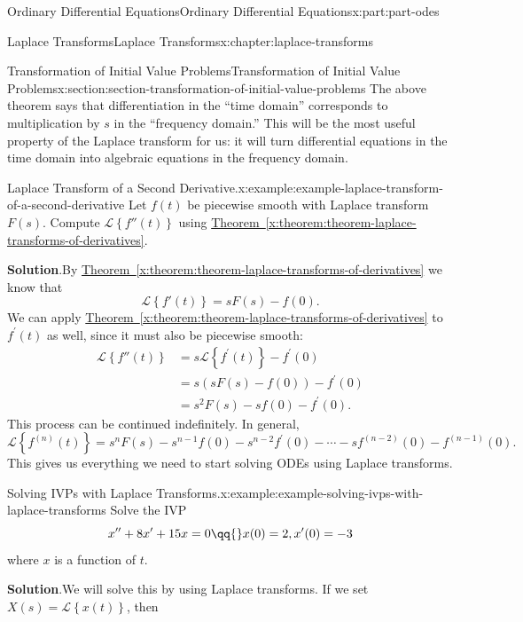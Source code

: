 \documentclass[twoside,10pt,]{book}
\newcommand{\blocktitlefont}{\relax}
\newcommand{\xreffont}{\relax}
\numberwithin{equation}{part}
\newcommand{\Laplace}[1]{\mathcal{L}\left\{#1\right\}}
\newcommand{\amp}{&}
\begin{document}
\begin{partptx}{Ordinary Differential Equations}{}{Ordinary Differential Equations}{}{}{x:part:part-odes}
\begin{chapterptx}{Laplace Transforms}{}{Laplace Transforms}{}{}{x:chapter:laplace-transforms}
\begin{sectionptx}{Transformation of Initial Value Problems}{}{Transformation of Initial Value Problems}{}{}{x:section:section-transformation-of-initial-value-problems}
The above theorem says that differentiation in the ``time domain'' corresponds to multiplication by \(s\) in the ``frequency domain.'' This will be the most useful property of the Laplace transform for us: it will turn differential equations in the time domain into algebraic equations in the frequency domain.%
\begin{example}{Laplace Transform of a Second Derivative.}{x:example:example-laplace-transform-of-a-second-derivative}%
Let \(f(t)\) be piecewise smooth with Laplace transform \(F(s)\). Compute \(\Laplace{f''(t)}\) using \hyperref[x:theorem:theorem-laplace-transforms-of-derivatives]{Theorem~{\xreffont\ref{x:theorem:theorem-laplace-transforms-of-derivatives}}}.%
\par\smallskip%
\noindent\textbf{\blocktitlefont Solution}.\hypertarget{g:solution:idp105548816605344}{}\quad{}By \hyperref[x:theorem:theorem-laplace-transforms-of-derivatives]{Theorem~{\xreffont\ref{x:theorem:theorem-laplace-transforms-of-derivatives}}} we know that%
\begin{equation*}
\Laplace{f'(t)} = sF(s)-f(0).
\end{equation*}
We can apply \hyperref[x:theorem:theorem-laplace-transforms-of-derivatives]{Theorem~{\xreffont\ref{x:theorem:theorem-laplace-transforms-of-derivatives}}} to \(f^\prime(t)\) as well, since it must also be piecewise smooth:%
\begin{align*}
\Laplace{f''(t)} \amp= s\Laplace{f^\prime(t)} - f^\prime(0)\\
\amp= s(sF(s)-f(0)) - f^\prime(0)\\
\amp= s^{2}F(s) - sf(0) - f^\prime(0)\text{.}
\end{align*}
This process can be continued indefinitely. In general,%
\begin{equation*}
\Laplace{f^{(n)}(t)} = s^{n}F(s) - s^{n-1}f(0) - s^{n-2}f^\prime(0) - \cdots -sf^{(n-2)}(0) - f^{(n-1)}(0).
\end{equation*}
This gives us everything we need to start solving ODEs using Laplace transforms.%
\end{example}
\begin{example}{Solving IVPs with Laplace Transforms.}{x:example:example-solving-ivps-with-laplace-transforms}%
Solve the IVP%
\begin{equation*}
x''+8x^\prime+15x = 0 \qq{} x(0) = 2, x^\prime(0) = -3
\end{equation*}
where \(x\) is a function of \(t\).%
\par\smallskip%
\noindent\textbf{\blocktitlefont Solution}.\hypertarget{g:solution:idp105548816610976}{}\quad{}We will solve this by using Laplace transforms. If we set \(X(s) = \Laplace{x(t)}\), then%

\end{example}
\end{sectionptx}
\end{chapterptx}
\end{partptx}
\end{document}
